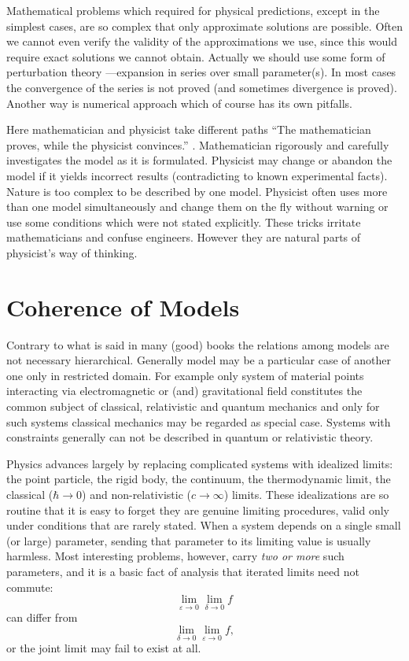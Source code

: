 Mathematical problems which required for physical predictions, except in the
simplest cases, are so complex that only approximate solutions are possible.
Often we cannot even verify the validity of the approximations we use, since
this would require exact solutions we cannot obtain. Actually we should use
some form of perturbation theory ---expansion in series over small
parameter(s). In most cases the convergence of the series is not proved (and
sometimes divergence is proved). Another way is numerical approach which of
course has its own pitfalls.

Here mathematician and physicist take different paths “The mathematician
proves, while the physicist convinces.” \cite{Medvedev2007}. Mathematician
rigorously and carefully investigates the model as it is formulated. Physicist
may change or abandon the model if it yields incorrect results (contradicting
to known experimental facts). Nature is too complex to be described by one
model. Physicist often uses more than one model simultaneously and change them
on the fly without warning or use some conditions which were not stated
explicitly. These tricks irritate mathematicians and confuse engineers. However
they are natural parts of physicist's way of thinking. 

\section{Coherence of Models}
\label{sec:rm-chm}

Contrary to what is said in many (good) books the relations among models are
not necessary hierarchical. Generally model may be a particular case of another
one only in restricted domain. For example only system of material points
interacting via electromagnetic or (and) gravitational field constitutes the
common subject of classical, relativistic and quantum mechanics and only for
such systems classical mechanics may be regarded as special case. Systems with
constraints generally can not be described in quantum or relativistic theory.

Physics advances largely by replacing complicated systems with
idealized limits: the point particle, the rigid body, the
continuum, the thermodynamic limit, the classical ($\hbar\to0$) 
and non-relativistic ($ c \to \infty $)
limits. These idealizations are so routine that it is easy to
forget they are genuine limiting procedures, valid only under
conditions that are rarely stated. When a system depends on a
single small (or large) parameter, sending that parameter to its
limiting value is usually harmless. Most interesting problems,
however, carry \emph{two or more} such parameters, and it is a
basic fact of analysis that iterated limits need not commute:
\[\lim_{\varepsilon\to0}\lim_{\delta\to0} f\]
can differ from
\[\lim_{\delta\to0}\lim_{\varepsilon\to0} f,\]
or the joint limit
may fail to exist at all. 

